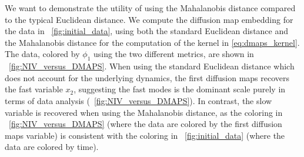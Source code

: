We want to demonstrate the utility of using the Mahalanobis distance compared to the typical Euclidean distance.
%
We compute the diffusion map embedding for the data in \fig~\ref{fig:initial_data},
using both the standard Euclidean distance and the Mahalanobis distance for the computation of the kernel in \eqref{eq:dmaps_kernel}.
%
The data, colored by $\phi_1$ using the two different metrics, are shown in \fig~\ref{fig:NIV_versus_DMAPS}.
%
When using the standard Euclidean distance which does not account for the underlying dynamics, the first diffusion maps recovers the fast variable $x_2$, suggesting the fast modes is the dominant scale purely in terms of data analysis (\fig~\ref{fig:NIV_versus_DMAPS}).
%
In contrast, the slow variable is recovered when using the Mahalanobis distance, as the coloring in \fig~\ref{fig:NIV_versus_DMAPS} (where the data are colored by the first diffusion maps variable) is consistent with the coloring in \fig~\ref{fig:initial_data} (where the data are colored by time).

